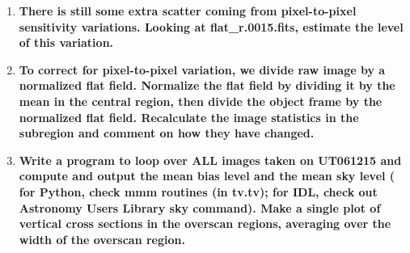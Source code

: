 \documentclass[12pt]{article}
\begin{document}
\begin{enumerate}[1.]
    \item \textbf{There is still some extra scatter coming from
    pixel-to-pixel sensitivity variations. Looking at
    flat\_r.0015.fits, estimate the level of this variation.}
    \item \textbf{To correct for pixel-to-pixel variation, we divide
    raw image by a normalized flat field. Normalize the flat field by
    dividing it by the mean in the central region, then divide the
    object frame by the normalized flat field. Recalculate the image
    statistics in the subregion and comment on how they have changed.}
    \item \textbf{Write a program to loop over ALL images taken on
    UT061215 and compute and output the mean bias level and the mean
    sky level ( for Python, check mmm routines (in tv.tv); for IDL,
    check out Astronomy Users Library sky command). Make a single plot
    of vertical cross sections in the overscan regions, averaging over
    the width of the overscan region.}

\end{enumerate}
\end{document}
